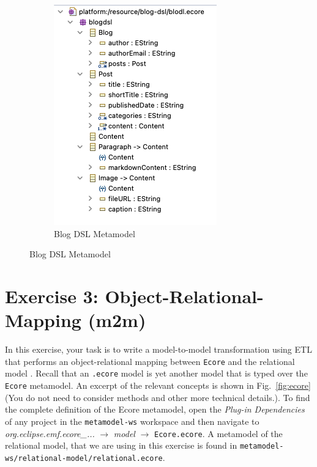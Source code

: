 \documentclass{article}
\begin{document}
\begin{figure}[bth]
\begin{subfigure}[c]{0.45\linewidth}
		\includegraphics[width=\linewidth]{figures/blog-dsl-metamodel}
		\caption{Blog DSL Metamodel}
		\label{fig:blogDSLMetampdel}
	\end{subfigure}
	\end{figure}
	
	\clearpage
	
	\section*{Exercise 3: Object-Relational-Mapping (m2m)}
	
	In this exercise, your task is to write a model-to-model transformation using ETL that performs an object-relational mapping between \texttt{Ecore} and the relational model \cite{Codd1970}.
	Recall that an \texttt{.ecore} model is yet another model that is typed over the \texttt{Ecore} metamodel.
	An excerpt of the relevant concepts is shown in Fig.~\ref{fig:ecore} (You do not need to consider methods and other more technical details.).
	To find the complete definition of the Ecore metamodel, open the \emph{Plug-in Dependencies} of any project in the \texttt{metamodel-ws} workspace and then navigate to \emph{org.eclipse.emf.ecore\_...} $\rightarrow$ \emph{model} 	$\rightarrow$ \texttt{Ecore.ecore}.
	A metamodel of the relational model, that we are using in this exercise is found in \texttt{metamodel-ws/relational-model/relational.ecore}.
	
\end{document}
